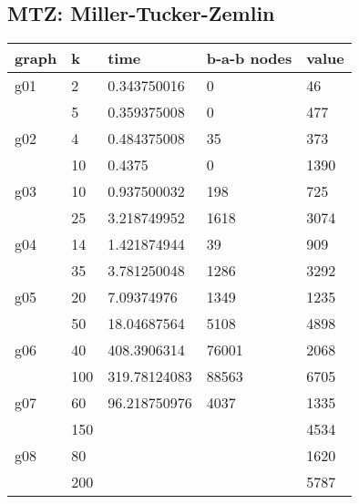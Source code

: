 \subsection{MTZ: Miller-Tucker-Zemlin}
\begin{tabular}{| l l l l l |}
\hline
graph	&	k	&	time	&	b-a-b nodes &	value	\\ \hline \hline 
g01	&	2	&	0.343750016	&	0			&	46	\\
	&	5	&	0.359375008	&	0			&	477	\\ \hline
g02	&	4	&	0.484375008	&	35			&	373	\\
	&	10	&	0.4375		&	0			&	1390	\\ \hline
g03	&	10	&	0.937500032	&	198			&	725	\\
	&	25	&	3.218749952	&	1618		&	3074	\\ \hline
g04	&	14	&	1.421874944	&	39			&	909	\\
	&	35	&	3.781250048	&	1286		&	3292	\\ \hline
g05	&	20	&	7.09374976	&	1349		&	1235	\\
	&	50	&	18.04687564	&	5108		&	4898	\\ \hline
g06	&	40	&	408.3906314	&	76001		&	2068	\\
	&	100	&	319.78124083&	88563		&	6705	\\ \hline
g07	&	60	&	96.218750976&	4037	&	1335	\\
	&	150	&				&		&	4534	\\ \hline
g08	&	80	&				&		&	1620	\\
	&	200	&				&		&	5787	\\ \hline
\end{tabular}

